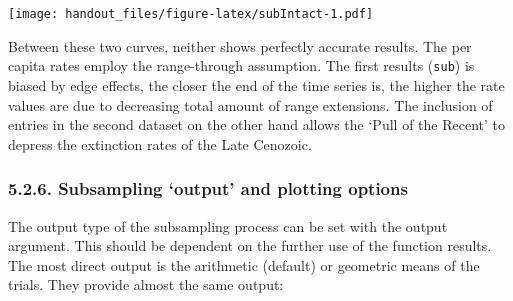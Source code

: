 \documentclass[]{article}
\begin{document}
\texttt{[image: handout\_files/figure-latex/subIntact-1.pdf]}

Between these two curves, neither shows perfectly accurate results. The
per capita rates employ the range-through assumption. The first results
(\texttt{sub}) is biased by edge effects, the closer the end of the time
series is, the higher the rate values are due to decreasing total amount
of range extensions. The inclusion of entries in the second dataset on
the other hand allows the `Pull of the Recent' to depress the extinction
rates of the Late Cenozoic.

\hypertarget{subsampling-output-and-plotting-options}{%
\subsubsection{5.2.6. Subsampling `output' and plotting
options}\label{subsampling-output-and-plotting-options}}

The output type of the subsampling process can be set with the output
argument. This should be dependent on the further use of the function
results. The most direct output is the arithmetic (default) or geometric
means of the trials. They provide almost the same output:
\end{document}
